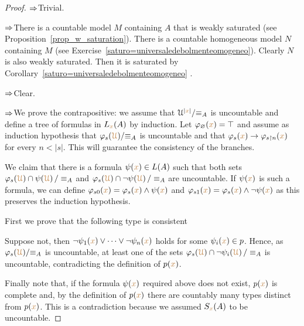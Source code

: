 \documentclass[creche.tex]{subfiles}
\begin{document}
\begin{proof} $\Rightarrow$\quad Trivial.


$\Rightarrow$\quad There is a countable model $M$ containing $A$ that is weakly saturated (see Proposition~\ref{prop_w_saturation}). There is a countable homogeneous model $N$ containing $M$ (see Exercise~\ref{saturo=universaledebolmenteomogeneo}). Clearly $N$ is also weakly saturated. Then it is saturated by Corollary~\ref{saturo=universaledebolmenteomogeneo} .


$\Rightarrow$\quad Clear.

$\Rightarrow$\quad We prove the contrapositive: we assume that $\EuScript U^{|{\color{brown} x}|}/\mathord\equiv_A$ is uncountable and define a tree of formulas in $L_{\color{brown} x}(A)$ by induction. Let $\varphi_\varnothing({\color{brown} x})=\top$ and assume as induction hypothesis that $\varphi_s({\color{brown}\EuScript U})/\mathord\equiv_A$ is uncountable and that $\varphi_s({\color{brown} x})\rightarrow\varphi_{s\restriction n}({\color{brown} x})$ for every $n<|s|$. This will guarantee the consistency of the branches.


We claim that there is a formula $\psi({\color{brown} x})\in L(A)$ such that both sets $\varphi_s({\color{brown}\EuScript U})\cap\psi({\color{brown}\EuScript U})\,/\equiv_A$ and $\varphi_s({\color{brown}\EuScript U})\cap\neg\psi({\color{brown}\EuScript U})\,/\equiv_A$ are uncountable. If $\psi({\color{brown} x})$ is such a formula, we can define $\varphi_{s0}({\color{brown} x})=\varphi_s({\color{brown} x})\wedge\psi({\color{brown} x})$ and $\varphi_{s1}({\color{brown} x})=\varphi_s({\color{brown} x})\wedge\neg\psi({\color{brown} x})$ as this preserves the induction hypothesis.


First we prove that the following type is consistent


Suppose not, then $\neg\psi_1({\color{brown} x})\vee\dots\vee\neg\psi_n({\color{brown} x})$ holds for some $\psi_i({\color{brown} x})\in p$. Hence, as $\varphi_s({\color{brown}\EuScript U})/\mathord\equiv_A$ is uncountable, at least one of the sets $\varphi_s({\color{brown}\EuScript U})\cap\neg\psi_i({\color{brown}\EuScript U})\,/\equiv_A$ is uncountable, contradicting the definition of $p({\color{brown} x})$.

Finally note that, if the formula $\psi({\color{brown} x})$ required above does not exist, $p({\color{brown} x})$ is complete and, by the definition of $p({\color{brown} x})$ there are countably many types distinct from $p({\color{brown} x})$. This is a contradiction because we assumed $S_{\color{brown} x}(A)$ to be uncountable.
\end{proof}
\end{document}
